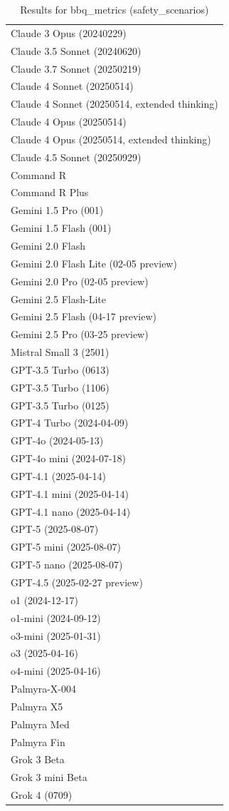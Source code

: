 \begin{table}[htp]
{\begin{tabular}{l}
Claude 3 Opus (20240229) \\
Claude 3.5 Sonnet (20240620) \\
Claude 3.7 Sonnet (20250219) \\
Claude 4 Sonnet (20250514) \\
Claude 4 Sonnet (20250514, extended thinking) \\
Claude 4 Opus (20250514) \\
Claude 4 Opus (20250514, extended thinking) \\
Claude 4.5 Sonnet (20250929) \\
Command R \\
Command R Plus \\
Gemini 1.5 Pro (001) \\
Gemini 1.5 Flash (001) \\
Gemini 2.0 Flash \\
Gemini 2.0 Flash Lite (02-05 preview) \\
Gemini 2.0 Pro (02-05 preview) \\
Gemini 2.5 Flash-Lite \\
Gemini 2.5 Flash (04-17 preview) \\
Gemini 2.5 Pro (03-25 preview) \\
Mistral Small 3 (2501) \\
GPT-3.5 Turbo (0613) \\
GPT-3.5 Turbo (1106) \\
GPT-3.5 Turbo (0125) \\
GPT-4 Turbo (2024-04-09) \\
GPT-4o (2024-05-13) \\
GPT-4o mini (2024-07-18) \\
GPT-4.1 (2025-04-14) \\
GPT-4.1 mini (2025-04-14) \\
GPT-4.1 nano (2025-04-14) \\
GPT-5 (2025-08-07) \\
GPT-5 mini (2025-08-07) \\
GPT-5 nano (2025-08-07) \\
GPT-4.5 (2025-02-27 preview) \\
o1 (2024-12-17) \\
o1-mini (2024-09-12) \\
o3-mini (2025-01-31) \\
o3 (2025-04-16) \\
o4-mini (2025-04-16) \\
Palmyra-X-004 \\
Palmyra X5 \\
Palmyra Med \\
Palmyra Fin \\
Grok 3 Beta \\
Grok 3 mini Beta \\
Grok 4 (0709) \\
\bottomrule
\end{tabular}}
\caption{Results for bbq_metrics (safety_scenarios)}
\label{fig:bbq_metrics (safety_scenarios)}
\end{table}